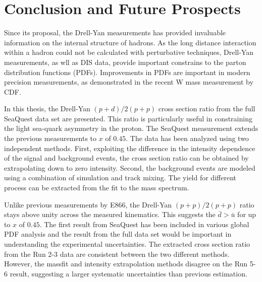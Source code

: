 \documentclass[../main.tex]{subfiles}
\begin{document}
\ifSubfilesClassLoaded{
	\mainmatter
	\setcounter{chapter}{5}
}{}

\chapter{Conclusion and Future Prospects}
\label{ch:conclusion}
Since its proposal, the Drell-Yan measurements has provided invaluable information
on the internal structure of hadrons. As the long distance interaction within a
hadron could not be calculated with perturbative techniques, Drell-Yan measurements,
as wll as DIS data, provide important constrains to the parton distribution functions
(PDFs). Improvements in PDFs are important in modern precision measurements, as
demonstrated in the recent W mass measurement by CDF.

In this thesis, the Drell-Yan $(p+d)/2(p+p)$ cross section ratio from the full
SeaQuest data set are presented. This ratio is particularly useful in constraining
the light sea-quark asymmetry in the proton. The SeaQuest measurement extends the
previous measurements to $x$ of $0.45$.
The data has been analyzed using two independent methods. First, exploiting the
difference in the intensity dependence of the signal and background events, the
cross section ratio can be obtained by extrapolating down to zero intensity.
Second, the background events are modeled using a combination of simulation and
track mixing. The yield for different process can be extracted from the fit to
the mass spectrum.

Unlike previous measurements by E866, the  Drell-Yan $(p+p)/2(p+p)$ ratio
stays above unity across the measured kinematics. This suggests the $\bar{d}>\bar{u}$
for up to $x$ of $0.45$.
The first result from SeaQuest has been included in various global PDF analysis
and the result from the full data set would be important in understanding the
experimental uncertainties. The extracted cross section ratio from the Run 2-3
data are consistent between the two different methods. However, the massfit
and intensity extrapolation methods disagree on the Run 5-6 result,
suggesting a larger systematic uncertainties than previous estimation.
\end{document}
